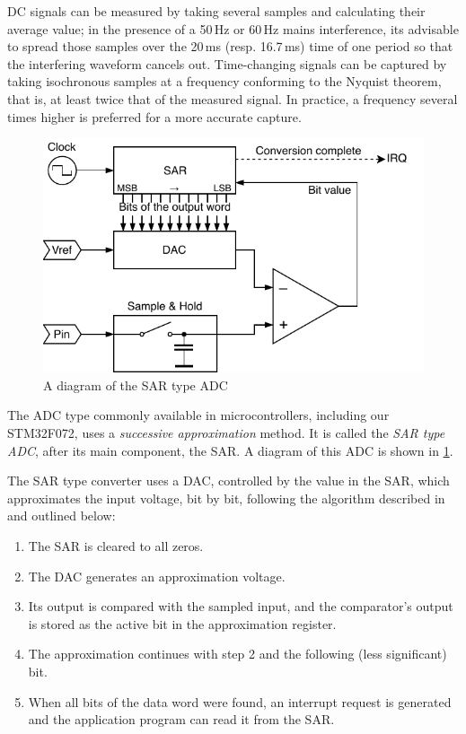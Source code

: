 \gls{DC} signals can be measured by taking several samples and calculating their average value; in the presence of a 50\,Hz or 60\,Hz mains interference, its advisable to spread those samples over the 20\,ms (resp. 16.7\,ms) time of one period so that the interfering waveform cancels out. Time-changing signals can be captured by taking isochronous samples at a frequency conforming to the Nyquist theorem, that is, at least twice that of the measured signal. In practice, a frequency several times higher is preferred for a more accurate capture.

\begin{figure}
	\centering
	\includegraphics[scale=1] {img/sar-adc.pdf}
	\caption{\label{fig:adc-sar}A diagram of the SAR type ADC}
\end{figure}

The \gls{ADC} type commonly available in microcontrollers, including our STM32F072, uses a \textit{successive approximation} method. It is called the \textit{SAR type \gls{ADC}}, after its main component, the \gls{SAR}. A diagram of this \gls{ADC} is shown in \cref{fig:adc-sar}.

The \gls{SAR} type converter uses a \gls{DAC}, controlled by the value in the \gls{SAR}, which approximates the input voltage, bit by bit, following the algorithm described in~\cite{adc-sar} and outlined below:

\begin{enumerate}
	\item The \gls{SAR} is cleared to all zeros.
	\item The \gls{DAC} generates an approximation voltage.
	\item Its output is compared with the sampled input, and the comparator's output is stored as the active bit in the approximation register.
	\item The approximation continues with step 2 and the following (less significant) bit.
	\item When all bits of the data word were found, an interrupt request is generated and the application program can read it from the \gls{SAR}.
\end{enumerate}

